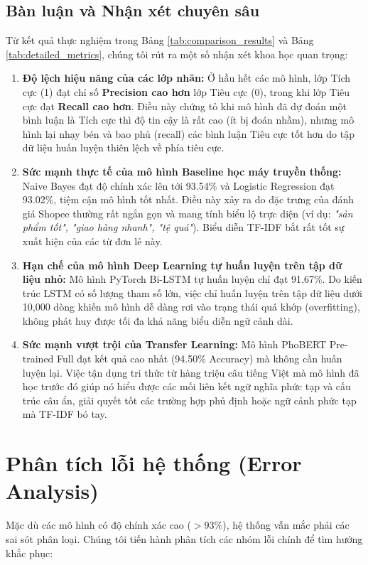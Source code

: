 \documentclass[12pt,a4paper]{article}
\begin{document}
\subsection{Bàn luận và Nhận xét chuyên sâu}
Từ kết quả thực nghiệm trong Bảng \ref{tab:comparison_results} và Bảng \ref{tab:detailed_metrics}, chúng tôi rút ra một số nhận xét khoa học quan trọng:
\begin{enumerate}
    \item \textbf{Độ lệch hiệu năng của các lớp nhãn:} 
    Ở hầu hết các mô hình, lớp Tích cực (1) đạt chỉ số \textbf{Precision cao hơn} lớp Tiêu cực (0), trong khi lớp Tiêu cực đạt \textbf{Recall cao hơn}. Điều này chứng tỏ khi mô hình đã dự đoán một bình luận là Tích cực thì độ tin cậy là rất cao (ít bị đoán nhầm), nhưng mô hình lại nhạy bén và bao phủ (recall) các bình luận Tiêu cực tốt hơn do tập dữ liệu huấn luyện thiên lệch về phía tiêu cực.
    
    \item \textbf{Sức mạnh thực tế của mô hình Baseline học máy truyền thống:} 
    Naive Bayes đạt độ chính xác lên tới 93.54\% và Logistic Regression đạt 93.02\%, tiệm cận mô hình tốt nhất. Điều này xảy ra do đặc trưng của đánh giá Shopee thường rất ngắn gọn và mang tính biểu lộ trực diện (ví dụ: \textit{"sản phẩm tốt", "giao hàng nhanh", "tệ quá"}). Biểu diễn TF-IDF bắt rất tốt sự xuất hiện của các từ đơn lẻ này.
    
    \item \textbf{Hạn chế của mô hình Deep Learning tự huấn luyện trên tập dữ liệu nhỏ:} 
    Mô hình PyTorch Bi-LSTM tự huấn luyện chỉ đạt 91.67\%. Do kiến trúc LSTM có số lượng tham số lớn, việc chỉ huấn luyện trên tập dữ liệu dưới 10,000 dòng khiến mô hình dễ dàng rơi vào trạng thái quá khớp (overfitting), không phát huy được tối đa khả năng biểu diễn ngữ cảnh dài.
    
    \item \textbf{Sức mạnh vượt trội của Transfer Learning:} 
    Mô hình PhoBERT Pre-trained Full đạt kết quả cao nhất (94.50\% Accuracy) mà không cần huấn luyện lại. Việc tận dụng tri thức từ hàng triệu câu tiếng Việt mà mô hình đã học trước đó giúp nó hiểu được các mối liên kết ngữ nghĩa phức tạp và cấu trúc câu ẩn, giải quyết tốt các trường hợp phủ định hoặc ngữ cảnh phức tạp mà TF-IDF bó tay.
\end{enumerate}

\newpage
\section{Phân tích lỗi hệ thống (Error Analysis)}
Mặc dù các mô hình có độ chính xác cao ($>93\%$), hệ thống vẫn mắc phải các sai sót phân loại. Chúng tôi tiến hành phân tích các nhóm lỗi chính để tìm hướng khắc phục:
\end{document}
